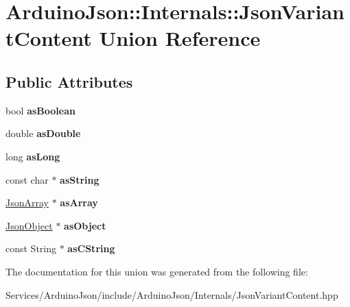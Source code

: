 \hypertarget{union_arduino_json_1_1_internals_1_1_json_variant_content}{}\section{Arduino\+Json\+:\+:Internals\+:\+:Json\+Variant\+Content Union Reference}
\label{union_arduino_json_1_1_internals_1_1_json_variant_content}
\subsection*{Public Attributes}
\begin{DoxyCompactItemize}
\item 
\hypertarget{union_arduino_json_1_1_internals_1_1_json_variant_content_a972d56c674b5e090505f56f4fa5b95fd}{}bool {\bfseries as\+Boolean}\label{union_arduino_json_1_1_internals_1_1_json_variant_content_a972d56c674b5e090505f56f4fa5b95fd}

\item 
\hypertarget{union_arduino_json_1_1_internals_1_1_json_variant_content_aafa12c0f2ed15255e99d3f2838c19fb8}{}double {\bfseries as\+Double}\label{union_arduino_json_1_1_internals_1_1_json_variant_content_aafa12c0f2ed15255e99d3f2838c19fb8}

\item 
\hypertarget{union_arduino_json_1_1_internals_1_1_json_variant_content_ac0f5263826960638b68e93092e8c3440}{}long {\bfseries as\+Long}\label{union_arduino_json_1_1_internals_1_1_json_variant_content_ac0f5263826960638b68e93092e8c3440}

\item 
\hypertarget{union_arduino_json_1_1_internals_1_1_json_variant_content_ab400fe863020ab5c4cc5f0e460dfcdfe}{}const char $\ast$ {\bfseries as\+String}\label{union_arduino_json_1_1_internals_1_1_json_variant_content_ab400fe863020ab5c4cc5f0e460dfcdfe}

\item 
\hypertarget{union_arduino_json_1_1_internals_1_1_json_variant_content_a0f2dd2b955f2eabdee4da7dc8127e328}{}\hyperlink{class_arduino_json_1_1_json_array}{Json\+Array} $\ast$ {\bfseries as\+Array}\label{union_arduino_json_1_1_internals_1_1_json_variant_content_a0f2dd2b955f2eabdee4da7dc8127e328}

\item 
\hypertarget{union_arduino_json_1_1_internals_1_1_json_variant_content_ae07d27d7bde99a3305e9f7218f74111a}{}\hyperlink{class_arduino_json_1_1_json_object}{Json\+Object} $\ast$ {\bfseries as\+Object}\label{union_arduino_json_1_1_internals_1_1_json_variant_content_ae07d27d7bde99a3305e9f7218f74111a}

\item 
\hypertarget{union_arduino_json_1_1_internals_1_1_json_variant_content_a636471ba024df5aaff87eb05c2c4aa3c}{}const String $\ast$ {\bfseries as\+C\+String}\label{union_arduino_json_1_1_internals_1_1_json_variant_content_a636471ba024df5aaff87eb05c2c4aa3c}

\end{DoxyCompactItemize}


The documentation for this union was generated from the following file\+:\begin{DoxyCompactItemize}
\item 
Services/\+Arduino\+Json/include/\+Arduino\+Json/\+Internals/Json\+Variant\+Content.\+hpp\end{DoxyCompactItemize}
